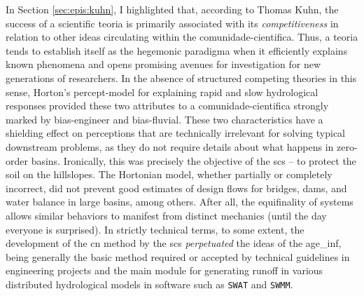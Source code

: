 \documentclass[./main_en.tex]{subfiles}
\begin{document}
\par In Section \ref{sec:epis:kuhn}, I highlighted that, according to Thomas Kuhn, the success of a scientific \gls{teoria} is primarily associated with its \textit{competitiveness} in relation to other ideas circulating within the \gls{comunidade-cientifica}. Thus, a \gls{teoria} tends to establish itself as the hegemonic \gls{paradigma} when it efficiently explains known phenomena and opens promising avenues for investigation for new generations of researchers. In the absence of structured competing theories in this sense, Horton’s \gls{percept-model} for explaining rapid and slow hydrological responses provided these two attributes to a \gls{comunidade-cientifica} strongly marked by \gls{bias-engineer} and \gls{bias-fluvial}. These two characteristics have a shielding effect on perceptions that are technically irrelevant for solving typical downstream problems, as they do not require details about what happens in zero-order basins. Ironically, this was precisely the objective of the \acrshort{scs} -- to protect the soil on the hillslopes. The Hortonian \gls{model}, whether partially or completely incorrect, did not prevent good estimates of design flows for bridges, dams, and water balance in large basins, among others. After all, the equifinality of systems allows similar behaviors to manifest from distinct mechanics (until the day everyone is surprised). In strictly technical terms, to some extent, the development of the \acrshort{cn} method by the \acrshort{scs} \textit{perpetuated} the ideas of the \gls{age_inf}, being generally the basic method required or accepted by technical guidelines in engineering projects and the main module for generating runoff in various distributed hydrological models in software such as \texttt{SWAT} and \texttt{SWMM}.
\end{document}
